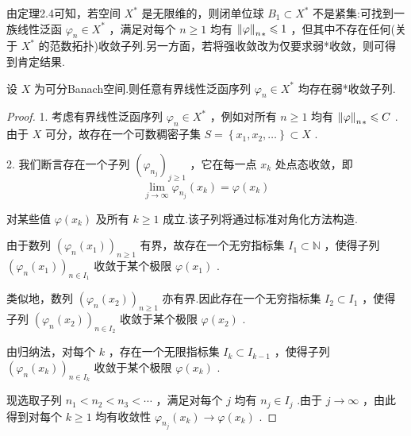 由定理2.4可知，若空间 ${X}^{ * }$ 是无限维的，则闭单位球 ${B}_{1} \subset  {X}^{ * }$ 不是紧集:可找到一族线性泛函 ${\varphi }_{n} \in  {X}^{ * }$ ，满足对每个 $n \geq  1$ 均有 ${\norm{\varphi }_{n}}_{ * } \leqslant  1$ ，但其中不存在任何(关于 ${X}^{ * }$ 的范数拓扑)收敛子列.另一方面，若将强收敛改为仅要求弱*收敛，则可得到肯定结果.

\begin{theorem}
设 $X$ 为可分Banach空间.则任意有界线性泛函序列 ${\varphi }_{n} \in  {X}^{ * }$ 均存在弱*收敛子列.\footnotemark
\end{theorem}

\begin{proof}
1. 考虑有界线性泛函序列 ${\varphi }_{n} \in  {X}^{ * }$ ，例如对所有 $n \geq  1$ 均有 ${\norm{\varphi }_{n}}_{ * } \leqslant  C$ .由于 $X$ 可分，故存在一个可数稠密子集 $S = \left\{  {{x}_{1},{x}_{2},\ldots }\right\}   \subset  X$ .

2. 我们断言存在一个子列 ${\left( {\varphi }_{{n}_{j}}\right) }_{j \geq  1}$ ，它在每一点 ${x}_{k}$ 处点态收敛，即
\begin{equation}\tag{2.40}
\mathop{\lim }\limits_{{j \rightarrow  \infty }}{\varphi }_{{n}_{j}}\left( {x}_{k}\right)  = \varphi \left( {x}_{k}\right)
\end{equation}

对某些值 $\varphi \left( {x}_{k}\right)$ 及所有 $k \geq  1$ 成立.该子列将通过标准对角化方法构造.

由于数列 ${\left( {\varphi }_{n}\left( {x}_{1}\right) \right) }_{n \geq  1}$ 有界，故存在一个无穷指标集 ${I}_{1} \subset  \mathbb{N}$ ，使得子列 ${\left( {\varphi }_{n}\left( {x}_{1}\right) \right) }_{n \in  {I}_{1}}$ 收敛于某个极限 $\varphi \left( {x}_{1}\right)$ .

类似地，数列 ${\left( {\varphi }_{n}\left( {x}_{2}\right) \right) }_{n \geq  1}$ 亦有界.因此存在一个无穷指标集 ${I}_{2} \subset  {I}_{1}$ ，使得子列 ${\left( {\varphi }_{n}\left( {x}_{2}\right) \right) }_{n \in  {I}_{2}}$ 收敛于某个极限 $\varphi \left( {x}_{2}\right)$ .

由归纳法，对每个 $k$ ，存在一个无限指标集 ${I}_{k} \subset  {I}_{k - 1}$ ，使得子列 ${\left( {\varphi }_{n}\left( {x}_{k}\right) \right) }_{n \in  {I}_{k}}$ 收敛于某个极限 $\varphi \left( {x}_{k}\right)$ .

现选取子列 ${n}_{1} < {n}_{2} < {n}_{3} < \cdots$ ，满足对每个 $j$ 均有 ${n}_{j} \in  {I}_{j}$ .由于 $j \rightarrow  \infty$ ，由此得到对每个 $k \geq  1$ 均有收敛性 ${\varphi }_{{n}_{j}}\left( {x}_{k}\right)  \rightarrow  \varphi \left( {x}_{k}\right)$ .


\end{proof}
